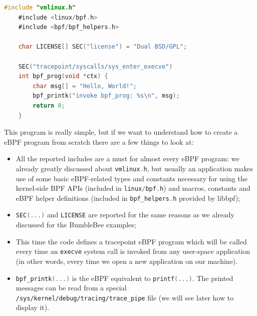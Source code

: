 \begin{lstlisting}[style=cstyle, language=C, caption={``Hello world!'' kernel side program using libbpf-bootstrap}, title=example\_helloworld.bpf.c]
	#include "vmlinux.h"
	#include <linux/bpf.h>
	#include <bpf/bpf_helpers.h>
	
	char LICENSE[] SEC("license") = "Dual BSD/GPL";
	
	SEC("tracepoint/syscalls/sys_enter_execve")
	int bpf_prog(void *ctx) {
		char msg[] = "Hello, World!";
		bpf_printk("invoke bpf_prog: %s\n", msg);
		return 0;
	}
\end{lstlisting}

This program is really simple, but if we want to understand how to create a eBPF program from scratch there are a few things to look at:

\begin{itemize}
	\item 
		All the reported includes are a must for almost every eBPF program: we already	greatly discussed about \colorbox{backcolour}{\lstinline[style=cstyle, language=C]|vmlinux.h|}, but usually an application makes use of some basic eBPF-related types and constants necessary for using the kernel-side BPF APIs (included in \colorbox{backcolour}{\lstinline[style=cstyle, language=C]|linux/bpf.h|}) and macros, constants and eBPF helper definitions (included in \colorbox{backcolour}{\lstinline[style=cstyle, language=C]|bpf_helpers.h|} provided by libbpf);
	\item 
		\colorbox{backcolour}{\lstinline[style=cstyle, language=C]|SEC(...)|} and \colorbox{backcolour}{\lstinline[style=cstyle, language=C]|LICENSE|} are reported for the same reasons as we already discussed for the BumbleBee examples;
	\item 
		This time the code defines a tracepoint eBPF program which will be called every time an \colorbox{backcolour}{\lstinline[style=highlight, language=bash]|execve|} system call is invoked from any user-space application (in other words, every time we open a new application on our machine).
	\item 
		\colorbox{backcolour}{\lstinline[style=cstyle, language=C]|bpf_printk(...)|} is the eBPF equivalent to \colorbox{backcolour}{\lstinline[style=cstyle, language=C]|printf(...)|}. 
		The printed messages can be read from a special \colorbox{backcolour}{\lstinline[style=highlight, language=bash]|/sys/kernel/debug/tracing/trace_pipe|} file (we will see later how to display it).
\end{itemize}


